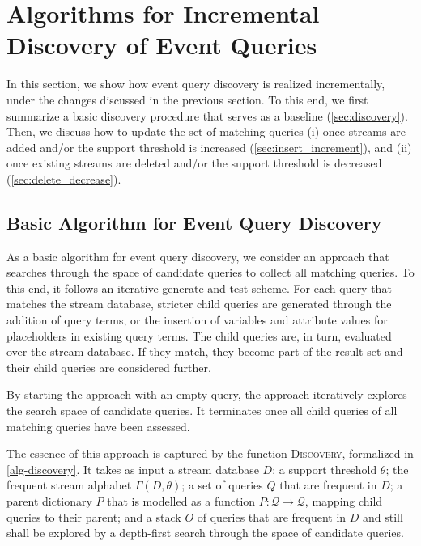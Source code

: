 \section{Algorithms for Incremental Discovery of Event Queries}
\label{sec:algos}

In this section, we show how event query discovery is
realized
incrementally, under the changes discussed in the previous section. To this
end, we first summarize a basic discovery procedure that serves as a
baseline (\autoref{sec:discovery}). Then, we discuss how
to update
the set of matching queries (i) once streams are added
and/or the support threshold is increased (\autoref{sec:insert_increment}),
and (ii) once
existing streams are deleted and/or the support threshold
is decreased (\autoref{sec:delete_decrease}).

\subsection{Basic Algorithm for Event Query Discovery}
\label{sec:discovery}

As a basic algorithm for event query discovery, we consider an approach that
searches through the space of candidate queries to collect all matching
queries. To this end, it follows an iterative generate-and-test scheme. For
each query that matches the stream database, stricter child queries are
generated through the addition of query terms, or the insertion of variables
and attribute values for placeholders in existing
query terms. The child
queries are, in turn, evaluated over the stream
database. If they match, they become part of the
result set and their child
queries are considered further.

By starting the approach with an empty query, the approach iteratively
explores the search space of candidate queries. It terminates once all child
queries of all matching queries have been assessed.

The essence of this approach is captured by the function \textsc{Discovery},
formalized in \autoref{alg-discovery}.
It takes as input a stream database $D$; a support threshold $\theta$;
the frequent stream alphabet $\Gamma(D,\theta)$;
a set of queries $Q$ that are frequent in $D$; a parent dictionary
$P$ that is modelled as a
function $P: \mathcal{Q} \to \mathcal{Q}$, mapping child queries to their
parent; and a stack $O$ of queries that are frequent in $D$ and still shall
be explored by a depth-first search through the
space of candidate queries.


